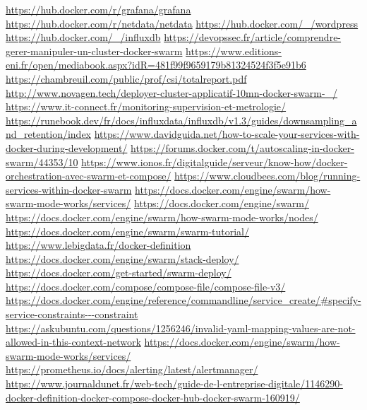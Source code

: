 \documentclass[oneside,12pt]{report}
\begin{document}
\begin{flushleft}
\url{https://hub.docker.com/r/grafana/grafana}\newline
\url{https://hub.docker.com/r/netdata/netdata}\newline
\url{https://hub.docker.com/_/wordpress}\newline
\url{https://hub.docker.com/_/influxdb}\newline
\url{https://devopssec.fr/article/comprendre-gerer-manipuler-un-cluster-docker-swarm}\newline
\url{https://www.editions-eni.fr/open/mediabook.aspx?idR=481f99f9659179b81324524f3f5e91b6}\newline
\url{https://chambreuil.com/public/prof/csi/totalreport.pdf}\newline
\url{http://www.novagen.tech/deployer-cluster-applicatif-10mn-docker-swarm-_/}\newline
\url{https://www.it-connect.fr/monitoring-supervision-et-metrologie/}\newline
\url{https://runebook.dev/fr/docs/influxdata/influxdb/v1.3/guides/downsampling_and_retention/index}\newline
\newpage
\url{https://www.davidguida.net/how-to-scale-your-services-with-docker-during-development/}\newline
\url{https://forums.docker.com/t/autoscaling-in-docker-swarm/44353/10}\newline
\url{https://www.ionos.fr/digitalguide/serveur/know-how/docker-orchestration-avec-swarm-et-compose/}\newline
\url{https://www.cloudbees.com/blog/running-services-within-docker-swarm}\newline
\url{https://docs.docker.com/engine/swarm/how-swarm-mode-works/services/}\newline
\url{https://docs.docker.com/engine/swarm/}\newline
\url{https://docs.docker.com/engine/swarm/how-swarm-mode-works/nodes/}\newline
\url{https://docs.docker.com/engine/swarm/swarm-tutorial/}\newline
\url{https://www.lebigdata.fr/docker-definition}\newline
\url{https://docs.docker.com/engine/swarm/stack-deploy/}\newline
\url{https://docs.docker.com/get-started/swarm-deploy/}\newline
\url{https://docs.docker.com/compose/compose-file/compose-file-v3/}\newline
\url{https://docs.docker.com/engine/reference/commandline/service_create/#specify-service-constraints---constraint}\newline
\url{https://askubuntu.com/questions/1256246/invalid-yaml-mapping-values-are-not-allowed-in-this-context-network}\newline
\url{https://docs.docker.com/engine/swarm/how-swarm-mode-works/services/}\newline
\url{https://prometheus.io/docs/alerting/latest/alertmanager/}\newline
\url{https://www.journaldunet.fr/web-tech/guide-de-l-entreprise-digitale/1146290-docker-definition-docker-compose-docker-hub-docker-swarm-160919/}\newline


\end{flushleft}
\end{document}
